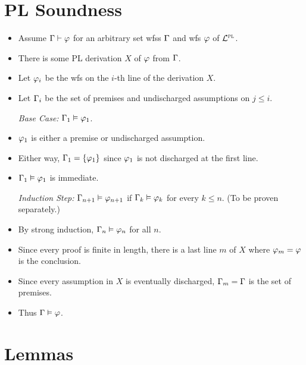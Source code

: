\documentclass[a4paper, 11pt]{article} %
\begin{document}
\section*{PL Soundness}

\begin{itemize}
  \item Assume $\Gamma \vdash \varphi$ for an arbitrary set wfss $\Gamma$ and wfs $\varphi$ of $\mathcal{L}^{\textsc{pl}}$.
  \item There is some PL derivation $X$ of $\varphi$ from $\Gamma$. 
  \item Let $\varphi_i$ be the wfs on the $i$-th line of the derivation $X$.
  \item Let $\Gamma_i$ be the set of premises and undischarged assumptions on $j \leq i$.
  \item[\it Base Case:] $\Gamma_1 \vDash \varphi_1$.
    \item $\varphi_1$ is either a premise or undischarged assumption.
    \item Either way, $\Gamma_1=\lbrace\varphi_1\rbrace$ since $\varphi_1$ is not discharged at the first line.
    \item $\Gamma_1 \vDash \varphi_1$ is immediate.
  \item[\it Induction Step:] $\Gamma_{n+1} \vDash \varphi_{n+1}$ if $\Gamma_k \vDash \varphi_k$ for every $k\leq n$.
    (To be proven separately.)
  \item By strong induction, $\Gamma_n \vDash \varphi_n$ for all $n$.
  \item Since every proof is finite in length, there is a last line $m$ of $X$ where $\varphi_m=\varphi$ is the conclusion.
  \item Since every assumption in $X$ is eventually discharged, $\Gamma_m=\Gamma$ is the set of premises.
  \item Thus $\Gamma \vDash \varphi$. 
\end{itemize}





\section*{Lemmas}
\end{document}
